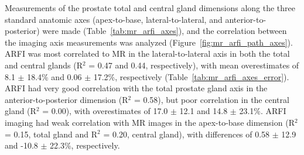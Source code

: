 Measurements of the prostate total and central gland dimensions along the three
standard anatomic axes (apex-to-base, lateral-to-lateral, and
anterior-to-posterior) were made (Table~\ref{tab:mr_arfi_axes}), and the
correlation between the imaging axis measurements was analyzed
(Figure~\ref{fig:mr_arfi_path_axes}).  ARFI was most correlated to MR in the
lateral-to-lateral axis in both the total and central glands (R$^2$ = 0.47 and
0.44, respectively), with mean overestimates of 8.1 $\pm$ 18.4\% and 0.06 $\pm$
17.2\%, respectively (Table~\ref{tab:mr_arfi_axes_error}).  ARFI had very good
correlation with the total prostate gland axis in the anterior-to-posterior
dimension (R$^2$ = 0.58), but poor correlation in the central gland (R$^2$ =
0.00), with overestimates of 17.0 $\pm$ 12.1 and 14.8 $\pm$ 23.1\%.  ARFI
imaging had weak correlation with MR images in the apex-to-base dimension
(R$^2$ = 0.15, total gland and R$^2$ = 0.20, central gland), with differences
of 0.58 $\pm$ 12.9 and -10.8 $\pm$ 22.3\%, respectively.





%

%

%
